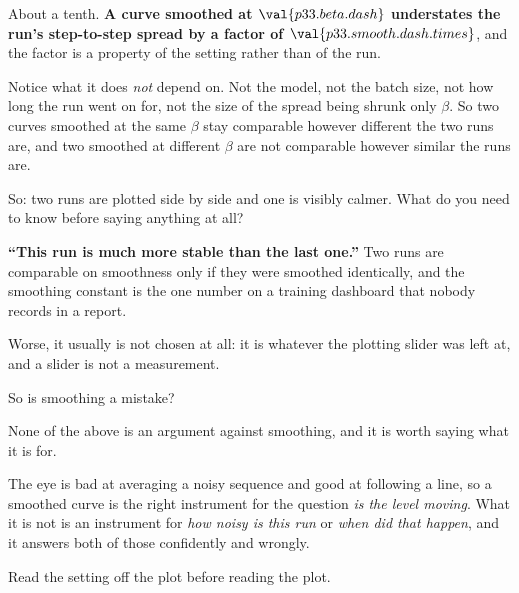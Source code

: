 \begin{fr}
About a tenth. \textbf{A curve smoothed at $\val{p33.beta.dash}$ understates
the run's step-to-step spread by a factor of
$\val{p33.smooth.dash.times}$}, and the factor is a property of the setting
rather than of the run.

Notice what it does \emph{not} depend on. Not the model, not the batch size,
not how long the run went on for, not the size of the spread being shrunk
\dash{} only $\beta$. So two curves smoothed at the same $\beta$ stay
comparable however different the two runs are, and two smoothed at different
$\beta$ are not comparable however similar the runs are.

So: two runs are plotted side by side and one is visibly calmer. What do you
need to know before saying anything at all?
\dotline
\nextframe
\end{fr}

\begin{fr}
\begin{trapbox}
\textbf{\enquote{This run is much more stable than the last one.}} Two runs
are comparable on smoothness only if they were smoothed identically, and the
smoothing constant is the one number on a training dashboard that nobody
records in a report.

Worse, it usually is not chosen at all: it is whatever the plotting slider
was left at, and a slider is not a measurement.
\end{trapbox}

So is smoothing a mistake?
\dotline
\nextframe
\end{fr}

\begin{fr}
None of the above is an argument against smoothing, and it is worth saying
what it is for.

The eye is bad at averaging a noisy sequence and good at following a line, so
a smoothed curve is the right instrument for the question
\emph{is the level moving}. What it is not is an instrument for
\emph{how noisy is this run} or \emph{when did that happen}, and it answers
both of those confidently and wrongly.

Read the setting off the plot before reading the plot.
\end{fr}



